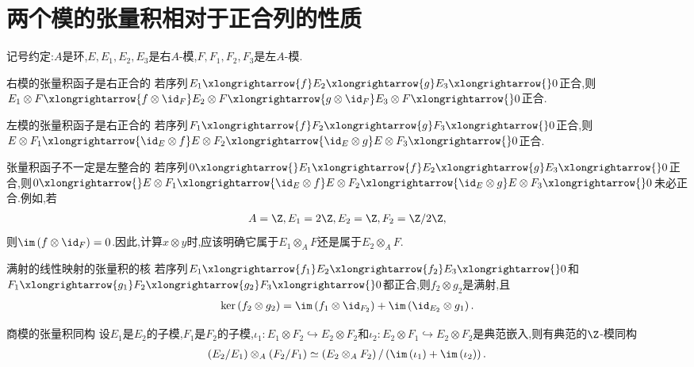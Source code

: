 \section{两个模的张量积相对于正合列的性质}

记号约定:$A$是环,$E,E_{1},E_{2},E_{3}$是右$A$-模,$F,F_{1},F_{2},F_{3}$是左$A$-模.

\begin{proposition}{右模的张量积函子是右正合的}{}
	若序列$E_{1}\xlongrightarrow{f}E_{2}\xlongrightarrow{g}E_{3}\xlongrightarrow{}0$正合,则$E_{1}\otimes F\xlongrightarrow{f\otimes \id_{F}}E_{2}\otimes F\xlongrightarrow{g\otimes \id_{F}}E_{3}\otimes F\xlongrightarrow{}0$正合.
\end{proposition}

\begin{corollary}{左模的张量积函子是右正合的}{}
	若序列$F_{1}\xlongrightarrow{f}F_{2}\xlongrightarrow{g}F_{3}\xlongrightarrow{}0$正合,则$E\otimes F_{1}\xlongrightarrow{\id_{E}\otimes f}E\otimes F_{2}\xlongrightarrow{\id_{E}\otimes g}E\otimes F_{3}\xlongrightarrow{}0$正合.
\end{corollary}

\begin{remark}{张量积函子不一定是左整合的}{}
	若序列$0\xlongrightarrow{}E_{1}\xlongrightarrow{f}E_{2}\xlongrightarrow{g}E_{3}\xlongrightarrow{}0$正合,则$0\xlongrightarrow{}E\otimes F_{1}\xlongrightarrow{\id_{E}\otimes f}E\otimes F_{2}\xlongrightarrow{\id_{E}\otimes g}E\otimes F_{3}\xlongrightarrow{}0$未必正合.例如,若
	\begin{align*}
		A=\Z,E_{1}=2\Z,E_{2}=\Z,F_{2}=\Z/2\Z,
	\end{align*}
	则$\im\left(f\otimes\id_{F}\right)=0$.因此,计算$x\otimes y$时,应该明确它属于$E_{1}\otimes_{A}F$还是属于$E_{2}\otimes_{A}F$.
\end{remark}

\begin{proposition}{满射的线性映射的张量积的核}{}
	若序列$E_{1}\xlongrightarrow{f_{1}}E_{2}\xlongrightarrow{f_{2}}E_{3}\xlongrightarrow{}0$和$F_{1}\xlongrightarrow{g_{1}}F_{2}\xlongrightarrow{g_{2}}F_{3}\xlongrightarrow{}0$都正合,则$f_{2}\otimes g_{2}$是满射,且
	\begin{align*}
		\ker\left(f_{2}\otimes g_{2}\right)=\im\left(f_{1}\otimes\id_{F_{2}}\right)+\im\left(\id_{E_{2}}\otimes g_{1}\right).
	\end{align*}
\end{proposition}

\begin{corollary}{商模的张量积同构}{}
	设$E_{1}$是$E_{2}$的子模,$F_{1}$是$F_{2}$的子模,$\iota_{1}:E_{1}\otimes F_{2}\hookrightarrow E_{2}\otimes F_{2}$和$\iota_{2}:E_{2}\otimes F_{1}\hookrightarrow E_{2}\otimes F_{2}$是典范嵌入,则有典范的$\Z$-模同构
	\begin{align*}
		\left(E_{2}/E_{1}\right)\otimes_{A}\left(F_{2}/F_{1}\right)\simeq\left(E_{2}\otimes_{A}F_{2}\right)/\left(\im\left(\iota_{1}\right)+\im\left(\iota_{2}\right)\right).
	\end{align*}
\end{corollary}

